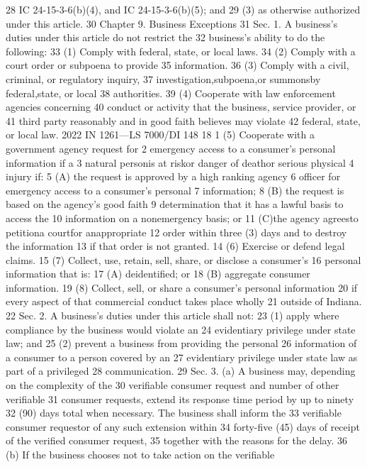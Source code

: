 28 IC 24-15-3-6(b)(4), and IC 24-15-3-6(b)(5); and
29 (3) as otherwise authorized under this article.
30 Chapter 9. Business Exceptions
31 Sec. 1. A business's duties under this article do not restrict the
32 business's ability to do the following:
33 (1) Comply with federal, state, or local laws.
34 (2) Comply with a court order or subpoena to provide
35 information.
36 (3) Comply with a civil, criminal, or regulatory inquiry,
37 investigation,subpoena,or summonsby federal,state, or local
38 authorities.
39 (4) Cooperate with law enforcement agencies concerning
40 conduct or activity that the business, service provider, or
41 third party reasonably and in good faith believes may violate
42 federal, state, or local law.
2022 IN 1261—LS 7000/DI 148
18
1 (5) Cooperate with a government agency request for
2 emergency access to a consumer's personal information if a
3 natural personis at riskor danger of deathor serious physical
4 injury if:
5 (A) the request is approved by a high ranking agency
6 officer for emergency access to a consumer's personal
7 information;
8 (B) the request is based on the agency's good faith
9 determination that it has a lawful basis to access the
10 information on a nonemergency basis; or
11 (C)the agency agreesto petitiona courtfor anappropriate
12 order within three (3) days and to destroy the information
13 if that order is not granted.
14 (6) Exercise or defend legal claims.
15 (7) Collect, use, retain, sell, share, or disclose a consumer's
16 personal information that is:
17 (A) deidentified; or
18 (B) aggregate consumer information.
19 (8) Collect, sell, or share a consumer's personal information
20 if every aspect of that commercial conduct takes place wholly
21 outside of Indiana.
22 Sec. 2. A business's duties under this article shall not:
23 (1) apply where compliance by the business would violate an
24 evidentiary privilege under state law; and
25 (2) prevent a business from providing the personal
26 information of a consumer to a person covered by an
27 evidentiary privilege under state law as part of a privileged
28 communication.
29 Sec. 3. (a) A business may, depending on the complexity of the
30 verifiable consumer request and number of other verifiable
31 consumer requests, extend its response time period by up to ninety
32 (90) days total when necessary. The business shall inform the
33 verifiable consumer requestor of any such extension within
34 forty-five (45) days of receipt of the verified consumer request,
35 together with the reasons for the delay.
36 (b) If the business chooses not to take action on the verifiable
